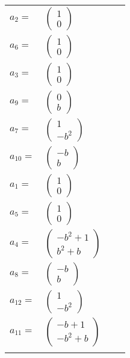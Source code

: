 \documentclass[1p]{elsarticle_modified}
\theoremstyle{definition}
\begin{document}
\begin{tabular}{m{7pt} m{180pt} m{7pt} m{180pt} }
\flushright $a_{2}=$&$\begin{pmatrix}1\\0\end{pmatrix}$ \\
\flushright $a_{6}=$&$\begin{pmatrix}1\\0\end{pmatrix}$ \\
\flushright $a_{3}=$&$\begin{pmatrix}1\\0\end{pmatrix}$ \\
\flushright $a_{9}=$&$\begin{pmatrix}0\\b\end{pmatrix}$ \\
\flushright $a_{7}=$&$\begin{pmatrix}1\\- b^2\end{pmatrix}$ \\
\flushright $a_{10}=$&$\begin{pmatrix}- b\\b\end{pmatrix}$ \\
\flushright $a_{1}=$&$\begin{pmatrix}1\\0\end{pmatrix}$ \\
\flushright $a_{5}=$&$\begin{pmatrix}1\\0\end{pmatrix}$ \\
\flushright $a_{4}=$&$\begin{pmatrix}- b^2+1\\b^2+b\end{pmatrix}$ \\
\flushright $a_{8}=$&$\begin{pmatrix}- b\\b\end{pmatrix}$ \\
\flushright $a_{12}=$&$\begin{pmatrix}1\\- b^2\end{pmatrix}$ \\
\flushright $a_{11}=$&$\begin{pmatrix}- b+1\\- b^2+b\end{pmatrix}$\\&\end{tabular}
\end{document}
